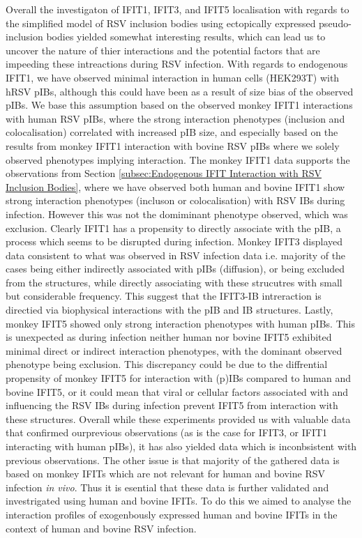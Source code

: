 Overall the investigaton of IFIT1, IFIT3, and IFIT5 localisation with regards to the simplified model of RSV inclusion bodies using ectopically expressed pseudo-inclusion bodies yielded somewhat interesting results, which can lead us to uncover the nature of thier interactions and the potential factors that are impeeding these intreactions during RSV infection. With regards to endogenous IFIT1, we have observed minimal interaction in human cells (HEK293T) with hRSV pIBs, although this could have been as a result of size bias of the observed pIBs. We base this assumption based on the observed monkey IFIT1 interactions with human RSV pIBs, where the strong interaction phenotypes (inclusion and colocalisation) correlated with increased pIB size, and especially based on the results from monkey IFIT1 interaction with bovine RSV pIBs where we solely observed phenotypes implying interaction. The monkey IFIT1 data supports the observations from Section \ref{subsec:Endogenous IFIT Interaction with RSV Inclusion Bodies}, where we have observed both human and bovine IFIT1 show strong interaction phenotypes (incluson or colocalisation) with RSV IBs during infection. However this was not the domiminant phenotype observed, which was exclusion. Clearly IFIT1 has a propensity to directly associate with the pIB, a process which seems to be disrupted during infection. Monkey IFIT3 displayed data consistent to what was observed in RSV infection data i.e. majority of the cases being either indirectly associated with pIBs (diffusion), or being excluded from the structures, while directly associating with these strucutres with small but considerable frequency. This suggest that the IFIT3-IB intreraction is directied via biophysical interactions with the pIB and IB structures. Lastly, monkey IFIT5 showed only strong interaction phenotypes with human pIBs. This is unexpected as during infection neither human nor bovine IFIT5 exhibited minimal direct or indirect interaction phenotypes, with the dominant observed phenotype being exclusion. This discrepancy could be due to the diffrential propensity of monkey IFIT5 for interaction with (p)IBs compared to human and bovine IFIT5, or it could mean that viral or cellular factors associated with and influencing the RSV IBs during infection prevent IFIT5 from interaction with these structures. Overall while these experiments provided us with valuable data that confirmed ourprevious observations (as is the case for IFIT3, or IFIT1 interacting with human pIBs), it has also yielded data which is inconbsistent with previous observations. The other issue is that majority of the gathered data is based on monkey IFITs which are not relevant for human and bovine RSV infection \textit{in vivo}. Thus it is esential that these data is further validated and investrigated using human and bovine IFITs. To do this we aimed to analyse the interaction profiles of exogenbously expressed human and bovine IFITs in the context of human and bovine RSV infection.

